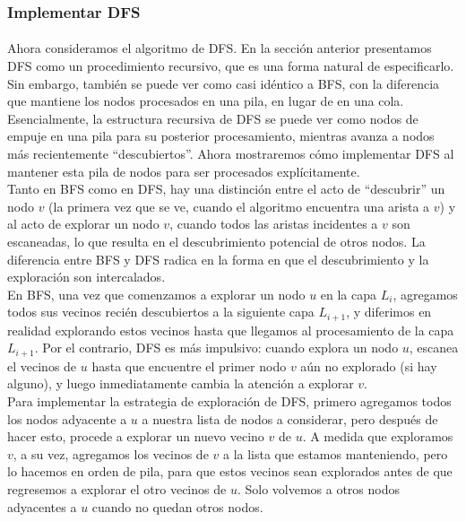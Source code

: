 \documentclass[a4paper, 12pt]{book}
\theoremstyle{dotless}
\begin{document}
\subsubsection*{Implementar DFS} 
\paragraph{}
Ahora consideramos el algoritmo de DFS. En la sección anterior
presentamos DFS como un procedimiento recursivo, que es una forma natural de especificarlo. Sin embargo, también se puede ver como casi idéntico a BFS, con la diferencia que mantiene los nodos procesados en una pila, en lugar de en una cola. Esencialmente, la estructura recursiva de DFS se puede ver como nodos de empuje en una pila para su posterior procesamiento, mientras avanza a nodos más recientemente ``descubiertos''. Ahora mostraremos cómo implementar DFS al mantener esta pila de nodos para ser procesados explícitamente.\\

Tanto en BFS como en DFS, hay una distinción entre el acto de ``descubrir''
un nodo $v$ (la primera vez que se ve, cuando el algoritmo encuentra una arista a $v$) y al acto de explorar un nodo $v$, cuando todos las aristas incidentes a $v$ son escaneadas, lo que resulta en el descubrimiento potencial de otros nodos. La diferencia entre BFS y DFS radica en la forma en que el descubrimiento y la exploración son intercalados.\\

En BFS, una vez que comenzamos a explorar un nodo $u$ en la capa \(L_{i}\), agregamos todos sus vecinos recién descubiertos a la siguiente capa \(L_{i+1}\), y diferimos en realidad explorando estos vecinos hasta que llegamos al procesamiento de la capa \(L_{i+1}\). Por el contrario, DFS es más impulsivo: cuando explora un nodo $u$, escanea el vecinos de $u$ hasta que encuentre el primer nodo $v$ aún no explorado (si hay alguno), y luego inmediatamente cambia la atención a explorar $v$.\\

Para implementar la estrategia de exploración de DFS, primero agregamos todos los nodos adyacente a $u$ a nuestra lista de nodos a considerar, pero después de hacer esto, procede a explorar un nuevo vecino $v$ de $u$. A medida que exploramos $v$, a su vez, agregamos los vecinos de $v$ a la lista que estamos manteniendo, pero lo hacemos en orden de pila, para que estos vecinos sean explorados antes de que regresemos a explorar el otro vecinos de $u$. Solo volvemos a otros nodos adyacentes a $u$ cuando no quedan otros nodos.\\
\end{document}
